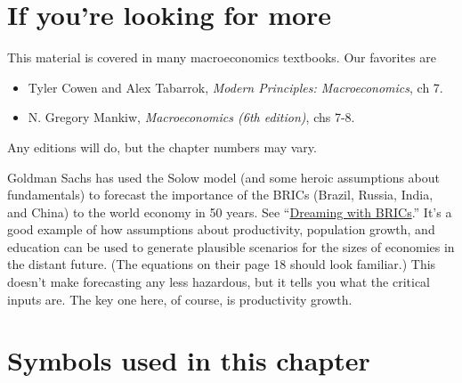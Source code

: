 \begin{enumerate}
\begin{comment}
(iii) Output per worker.
The last step is to make the shift from $K/Y$ to $Y/L$.
We divide the production function by $K$, giving us
\begin{eqnarray*}
    (K/L)^{1-\alpha} &=& A (K/Y)
        \;\;\;\Rightarrow\;\;\;
        K/L \;\;=\;\; \left( \frac{ A s}{g_l + \delta} \right)^{1/(1-\alpha)}.
\end{eqnarray*}

Now we can do the calculations.
With $g_l=0.01$, steady-state output per worker is 1.348.
When $g_l=0.02$, it falls to 1.291, a drop of about 4 percent.
\end{comment}



\end{enumerate}

\section*{If you're looking for more}

This material is covered in many macroeconomics textbooks.
Our favorites are
\begin{itemize}
\item Tyler Cowen and Alex Tabarrok,
{\it Modern Principles: Macroeconomics\/}, ch 7.
\item N. Gregory Mankiw, {\it Macroeconomics (6th edition)\/}, chs 7-8.
\end{itemize}
Any editions will do, but the chapter numbers may vary.


Goldman Sachs has used the Solow model
(and some heroic assumptions about fundamentals) to forecast the importance of
the BRICs (Brazil, Russia, India, and China)
to the world economy in 50 years.
See
``\href{http://www.goldmansachs.com/korea/ideas/brics/99-dreaming.pdf}
{Dreaming with BRICs}.''
It's a good example of how assumptions about productivity, population growth, and education can be used to generate plausible scenarios for the sizes of economies in the distant future.
(The equations on their page 18 should look familiar.)
This doesn't make forecasting any less hazardous, but it tells you
what the critical inputs are.
The key one here, of course, is productivity growth.

\section*{Symbols used in this chapter}


